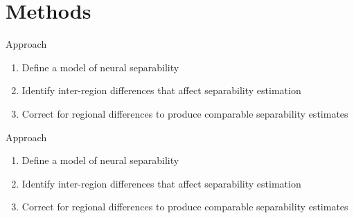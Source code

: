 \documentclass[aspectratio=169, handout]{beamer}
\begin{document}

\section{Methods}

\begin{frame}{Approach}
    \begin{enumerate}
        \item Define a model of neural separability \pause 
        \item Identify inter-region differences that affect separability estimation \pause 
        \item Correct for regional differences to produce comparable separability estimates
    \end{enumerate}
\end{frame}

\begin{frame}{Approach}
    \begin{enumerate}
        \item Define a model of neural separability
        \color{gray} \item  Identify inter-region differences that affect separability estimation 
        \color{gray} \item  Correct for regional differences to produce comparable separability estimates
    \end{enumerate}
\end{frame}
\end{document}

